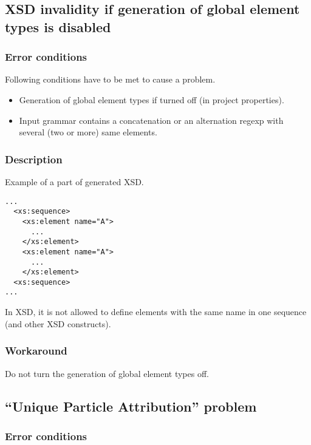 \documentclass[a4paper,10pt,oneside]{article}
\begin{document}
\subsection{XSD invalidity if generation of global element types is disabled}

\subsubsection{Error conditions}

Following conditions have to be met to cause a problem.

\begin{itemize}
	\item Generation of global element types if turned off (in project properties).
	\item Input grammar contains a concatenation or an alternation regexp with several (two or more) same elements.
\end{itemize}

\subsubsection{Description}

Example of a part of generated XSD.

\begin{verbatim}
...
  <xs:sequence>
    <xs:element name="A">
      ...
    </xs:element>
    <xs:element name="A">
      ...
    </xs:element>
  <xs:sequence>
...
\end{verbatim}

In XSD, it is not allowed to define elements with the same name in one sequence (and other XSD constructs).

\subsubsection{Workaround}

Do not turn the generation of global element types off.

\subsection{``Unique Particle Attribution'' problem}

\subsubsection{Error conditions}
\end{document}
